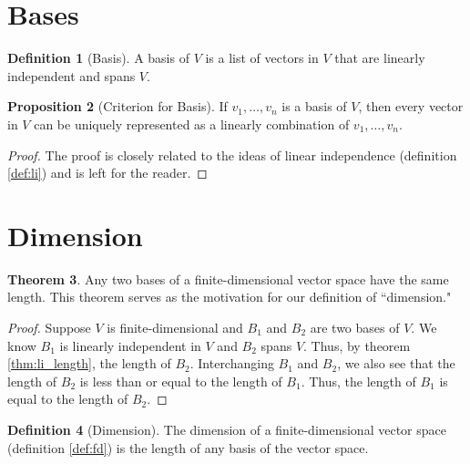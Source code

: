 \documentclass[12pt]{report}
\numberwithin{equation}{section}
\theoremstyle{definition}
\newtheorem{theorem}{Theorem}[section]
\newtheorem{definition}[theorem]{Definition}
\newtheorem{proposition}[theorem]{Proposition}
\begin{document}
\section{Bases}

\begin{definition}[Basis]
	A basis of $ V $ is a list of vectors in $ V $ that are linearly independent and spans $ V $. 
\end{definition}

\begin{proposition}[Criterion for Basis]
	If $ v_1, \dots, v_n $ is a basis of $ V $, then every vector in $ V $ can be uniquely represented as a linearly combination of  $ v_1, \dots, v_n $.
\end{proposition}
\begin{proof}
	The proof is closely related to the ideas of linear independence (definition \ref{def:li}) and is left for the reader.
\end{proof}

\section{Dimension}

\begin{theorem}
	Any two bases of a finite-dimensional vector space have the same length. This theorem serves as the motivation for our definition of ``dimension."
\end{theorem}
\begin{proof}
	Suppose $ V $ is finite-dimensional and $ B_1 $ and $ B_2 $ are two bases of $ V $. We know $ B_1 $ is linearly independent in $ V $ and $ B_2 $ spans $ V $. Thus, by theorem \ref{thm:li_length}, the length of $ B_2 $. Interchanging $ B_1 $ and $ B_2 $, we also see that the length of $ B_2 $ is less than or equal to the length of $ B_1 $. Thus, the length of $ B_1 $ is equal to the length of $ B_2 $.
\end{proof}

\begin{definition}[Dimension]
	The dimension of a finite-dimensional vector space (definition \ref{def:fd}) is the length of any basis of the vector space.
\end{definition}
\end{document}
